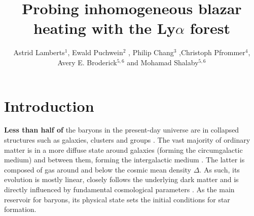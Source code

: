 \documentclass[numberedappendix]{emulateapj}
\newcommand\ALc[1]{{\color{red} \bf #1}} %
\begin{document}
\title{Probing inhomogeneous blazar heating with the Ly$\alpha$ forest}
\author{Astrid Lamberts$^1$,  Ewald Puchwein$^2$ , Philip Chang$^3$ ,Christoph Pfrommer$^4$, Avery E. Broderick$^{5,6}$ and Mohamad Shalaby$^{5,6}$}
\begin{abstract}

\end{abstract}
\keywords{}
\section{Introduction}

\ALc{Less than half  of} the baryons in the present-day universe are in collapsed structures such as galaxies, clusters and groups \citep{2012ApJ...759...23S}. The vast majority of ordinary matter is in a more diffuse state around galaxies (forming the circumgalactic medium) and  between them, forming the intergalactic medium \citep[IGM, see][for a recent review]{2016ARA&A..54..313M}. The latter is composed of gas around  and below the cosmic mean density $\Delta$. As such, its evolution is mostly linear, closely follows the underlying dark matter and is directly influenced by fundamental cosmological parameters \citep{2013A&A...559A..85P,2013JCAP...04..026S,2015JCAP...11..011P}.  As the main reservoir for baryons,  its physical state sets the initial conditions for star formation.
\end{document}
